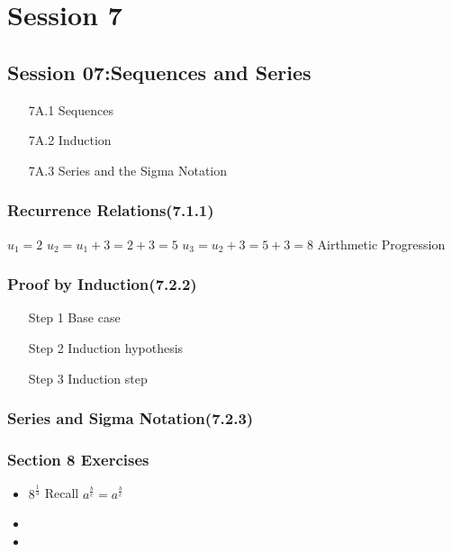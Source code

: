 \documentclass[]{report}
\begin{document}
	


\chapter{Session 7}


\section*{Session 07:Sequences and Series}
\begin{itemize}
\item[7A.1] Sequences
\item[7A.2] Induction
\item[7A.3] Series and the Sigma Notation
\end{itemize}

\subsection*{Recurrence Relations(7.1.1)}



$u_1 = 2$
$u_2 = u_1 + 3 = 2 +3 = 5$
$u_3 = u_2 + 3 = 5+ 3 = 8$
Airthmetic Progression


\subsection*{Proof by Induction(7.2.2)}
\begin{itemize}
\item[Step 1] Base case
\item[Step 2] Induction hypothesis
\item[Step 3] Induction step
\end{itemize}



\subsection*{Series and Sigma Notation(7.2.3)}








\subsection*{Section 8 Exercises}
\begin{itemize}
\item $8^{\frac{1}{3}}$ Recall $a^{\frac{b}{c}} = a^{\frac{b}{c}}$
\item
\item
\end{itemize}
\end{document}

